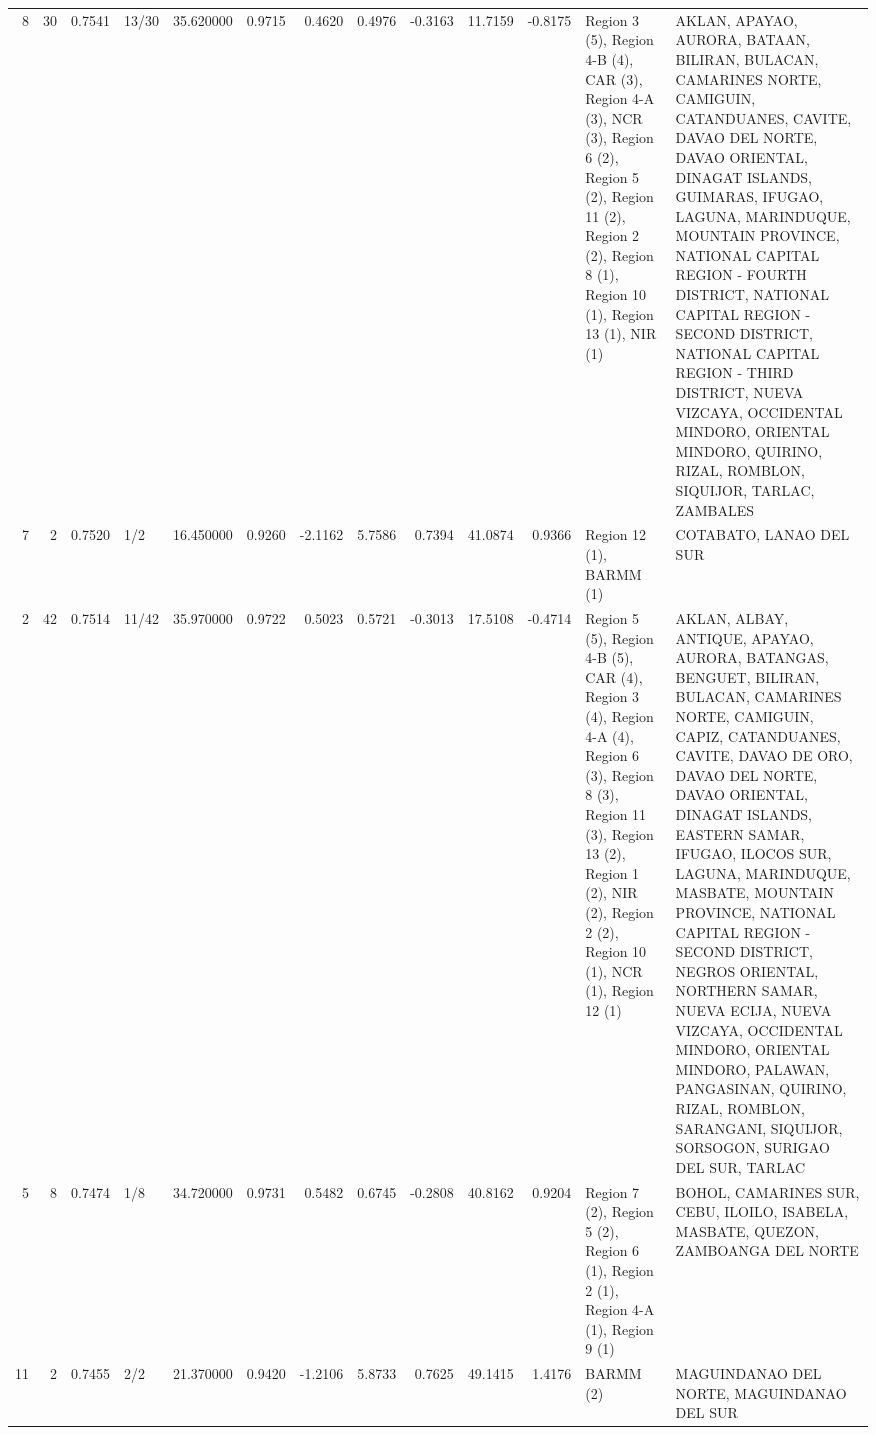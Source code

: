 \begin{tabular}{rrrlrrrrrrrll}
8 & 30 & {\cellcolor[HTML]{9FBFFF}} \color[HTML]{000000} 0.7541 & 13/30 & {\cellcolor[HTML]{F59F80}} \color[HTML]{000000} 35.620000 & 0.9715 & 0.4620 & 0.4976 & -0.3163 & 11.7159 & -0.8175 & Region 3 (5), Region 4-B (4), CAR (3), Region 4-A (3), NCR (3), Region 6 (2), Region 5 (2), Region 11 (2), Region 2 (2), Region 8 (1), Region 10 (1), Region 13 (1), NIR (1) & AKLAN, APAYAO, AURORA, BATAAN, BILIRAN, BULACAN, CAMARINES NORTE, CAMIGUIN, CATANDUANES, CAVITE, DAVAO DEL NORTE, DAVAO ORIENTAL, DINAGAT ISLANDS, GUIMARAS, IFUGAO, LAGUNA, MARINDUQUE, MOUNTAIN PROVINCE, NATIONAL CAPITAL REGION - FOURTH DISTRICT, NATIONAL CAPITAL REGION - SECOND DISTRICT, NATIONAL CAPITAL REGION - THIRD DISTRICT, NUEVA VIZCAYA, OCCIDENTAL MINDORO, ORIENTAL MINDORO, QUIRINO, RIZAL, ROMBLON, SIQUIJOR, TARLAC, ZAMBALES \\
7 & 2 & {\cellcolor[HTML]{97B8FF}} \color[HTML]{000000} 0.7520 & 1/2 & {\cellcolor[HTML]{465ECF}} \color[HTML]{F1F1F1} 16.450000 & 0.9260 & -2.1162 & 5.7586 & 0.7394 & 41.0874 & 0.9366 & Region 12 (1), BARMM (1) & COTABATO, LANAO DEL SUR \\
2 & 42 & {\cellcolor[HTML]{94B6FF}} \color[HTML]{000000} 0.7514 & 11/42 & {\cellcolor[HTML]{F4987A}} \color[HTML]{000000} 35.970000 & 0.9722 & 0.5023 & 0.5721 & -0.3013 & 17.5108 & -0.4714 & Region 5 (5), Region 4-B (5), CAR (4), Region 3 (4), Region 4-A (4), Region 6 (3), Region 8 (3), Region 11 (3), Region 13 (2), Region 1 (2), NIR (2), Region 2 (2), Region 10 (1), NCR (1), Region 12 (1) & AKLAN, ALBAY, ANTIQUE, APAYAO, AURORA, BATANGAS, BENGUET, BILIRAN, BULACAN, CAMARINES NORTE, CAMIGUIN, CAPIZ, CATANDUANES, CAVITE, DAVAO DE ORO, DAVAO DEL NORTE, DAVAO ORIENTAL, DINAGAT ISLANDS, EASTERN SAMAR, IFUGAO, ILOCOS SUR, LAGUNA, MARINDUQUE, MASBATE, MOUNTAIN PROVINCE, NATIONAL CAPITAL REGION - SECOND DISTRICT, NEGROS ORIENTAL, NORTHERN SAMAR, NUEVA ECIJA, NUEVA VIZCAYA, OCCIDENTAL MINDORO, ORIENTAL MINDORO, PALAWAN, PANGASINAN, QUIRINO, RIZAL, ROMBLON, SARANGANI, SIQUIJOR, SORSOGON, SURIGAO DEL SUR, TARLAC \\
5 & 8 & {\cellcolor[HTML]{84A7FC}} \color[HTML]{F1F1F1} 0.7474 & 1/8 & {\cellcolor[HTML]{F7AA8C}} \color[HTML]{000000} 34.720000 & 0.9731 & 0.5482 & 0.6745 & -0.2808 & 40.8162 & 0.9204 & Region 7 (2), Region 5 (2), Region 6 (1), Region 2 (1), Region 4-A (1), Region 9 (1) & BOHOL, CAMARINES SUR, CEBU, ILOILO, ISABELA, MASBATE, QUEZON, ZAMBOANGA DEL NORTE \\
11 & 2 & {\cellcolor[HTML]{7B9FF9}} \color[HTML]{F1F1F1} 0.7455 & 2/2 & {\cellcolor[HTML]{82A6FB}} \color[HTML]{F1F1F1} 21.370000 & 0.9420 & -1.2106 & 5.8733 & 0.7625 & 49.1415 & 1.4176 & BARMM (2) & MAGUINDANAO DEL NORTE, MAGUINDANAO DEL SUR \\

\end{tabular}
